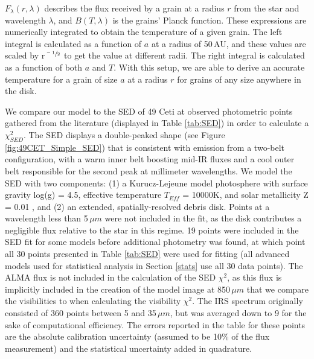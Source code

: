 $F_{\lambda}(r,\lambda)$ describes the flux received by a grain at a radius $r$ from the star and wavelength $\lambda$, and $B(T,\lambda)$ is the grains' Planck function. These expressions are numerically integrated to obtain the temperature of a given grain. The left integral is calculated as a function of $a$ at a radius of 50\,AU, and these values are scaled by r$^{\sfrac{-1}{2}}$ to get the value at different radii. The right integral is calculated as a function of both $a$ and $T$. With this setup, we are able to derive an accurate temperature for a grain of size $a$ at a radius $r$ for grains of any size anywhere in the disk. 


We compare our model to the SED of 49 Ceti at observed photometric points gathered from the literature (displayed in Table \ref{tab:SED}) in order to calculate a $\chi^{2}_{SED}$. The SED displays a double-peaked shape (see Figure \ref{fig:49CET_Simple_SED}) that is consistent with emission from a two-belt configuration, with a warm inner belt boosting mid-IR fluxes and a cool outer belt responsible for the second peak at millimeter wavelengths. We model the SED with two components: (1) a Kurucz-Lejeune model photosphere with surface gravity log(g) = 4.5, effective temperature $T_{Eff}$ = 10000K, and solar metallicity Z = 0.01 \citep{Chen06}, and (2) an extended, spatially-resolved debris disk. Points at a wavelength less than 5$\,\mu m$ were not included in the fit, as the disk contributes a negligible flux relative to the star in this regime. 19 points were included in the SED fit for some models before additional photometry was found, at which point all 30 points presented in Table \ref{tab:SED} were used for fitting (all advanced models used for statistical analysis in Section \ref{stats} use all 30 data points). The ALMA flux is not included in the calculation of the SED $\chi^{2}$, as this flux is implicitly included in the creation of the model image at 850$\,\mu m$ that we compare the visibilities to when calculating the visibility $\chi^{2}$. The IRS spectrum originally consisted of 360 points between 5 and 35$\,\mu m$, but was averaged down to 9 for the sake of computational efficiency. The errors reported in the table for these points are the absolute calibration uncertainty (assumed to be 10$\%$ of the flux measurement) and the statistical uncertainty added in quadrature.

